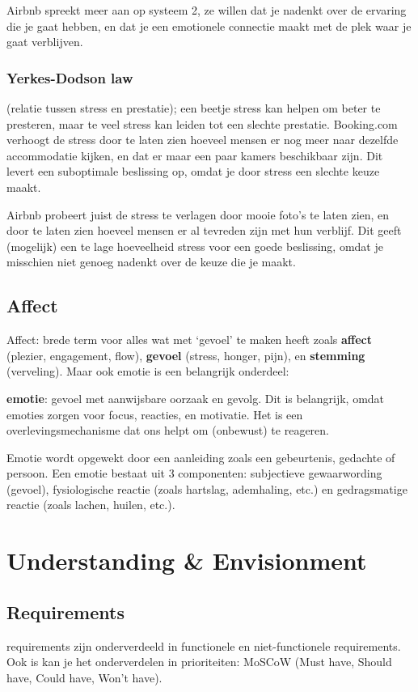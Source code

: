 \documentclass[nonacm, sigconf, balance=true]{acmart}
\begin{document}
    Airbnb spreekt meer aan op systeem 2, ze willen dat je nadenkt over de ervaring die je gaat hebben, en dat je een emotionele connectie maakt met de plek waar je gaat verblijven.

    \subsubsection{Yerkes-Dodson law} (relatie tussen stress en prestatie); een beetje stress kan helpen om beter te presteren, maar te veel stress kan leiden tot een slechte prestatie.
    Booking.com verhoogt de stress door te laten zien hoeveel mensen er nog meer naar dezelfde accommodatie kijken, en dat er maar een paar kamers beschikbaar zijn.
    Dit levert een suboptimale beslissing op, omdat je door stress een slechte keuze maakt.

    Airbnb probeert juist de stress te verlagen door mooie foto's te laten zien, en door te laten zien hoeveel mensen er al tevreden zijn met hun verblijf.
    Dit geeft (mogelijk) een te lage hoeveelheid stress voor een goede beslissing, omdat je misschien niet genoeg nadenkt over de keuze die je maakt.

    \subsection{Affect}
    Affect: brede term voor alles wat met ‘gevoel’ te maken heeft
    zoals \textbf{affect} (plezier, engagement, flow), \textbf{gevoel} (stress, honger, pijn), en \textbf{stemming} (verveling).
    Maar ook emotie is een belangrijk onderdeel:

    \vspace{\baselineskip}

    \noindent \textbf{emotie}: gevoel met aanwijsbare oorzaak en gevolg.
    Dit is belangrijk, omdat emoties zorgen voor focus, reacties, en motivatie.
    Het is een overlevingsmechanisme dat ons helpt om (onbewust) te reageren.

    Emotie wordt opgewekt door een aanleiding zoals een gebeurtenis, gedachte of persoon.
    Een emotie bestaat uit 3 componenten: subjectieve gewaarwording (gevoel), fysiologische reactie (zoals hartslag, ademhaling, etc.) en gedragsmatige reactie (zoals lachen, huilen, etc.).

    \section{Understanding \& Envisionment}
    \subsection{Requirements}
    requirements zijn onderverdeeld in functionele en niet-functionele requirements.
    Ook is kan je het onderverdelen in prioriteiten: MoSCoW (Must have, Should have, Could have, Won't have).
\end{document}
